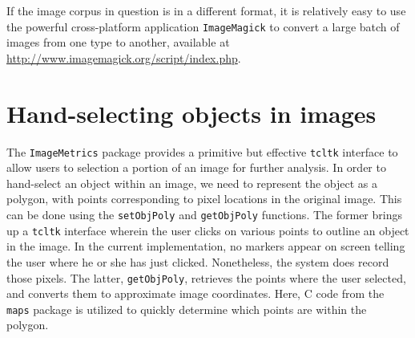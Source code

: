 \documentclass[12pt]{article}
\begin{document}
If the image corpus in question is in a different format, it is relatively easy to use the powerful cross-platform application \texttt{ImageMagick} to convert a large batch of images from one type to another, available at \url{http://www.imagemagick.org/script/index.php}.     

\section{Hand-selecting objects in images}
The \texttt{ImageMetrics} package provides a primitive but effective \texttt{tcltk} interface to allow users to selection a portion of an image for further analysis.  In order to hand-select an object within an image, we need to represent the object as a polygon, with points corresponding to pixel locations in the original image.  This can be done using the \texttt{setObjPoly} and \texttt{getObjPoly} functions.  The former brings up a \texttt{tcltk} interface wherein the user clicks on various points to outline an object in the image.  In the current implementation, no markers appear on screen telling the user where he or she has just clicked.  Nonetheless, the system does record those pixels.  The latter, \texttt{getObjPoly}, retrieves the points where the user selected, and converts them to approximate image coordinates.  Here, C code from the \texttt{maps} package is utilized to quickly determine which points are within the polygon.
\end{document}
